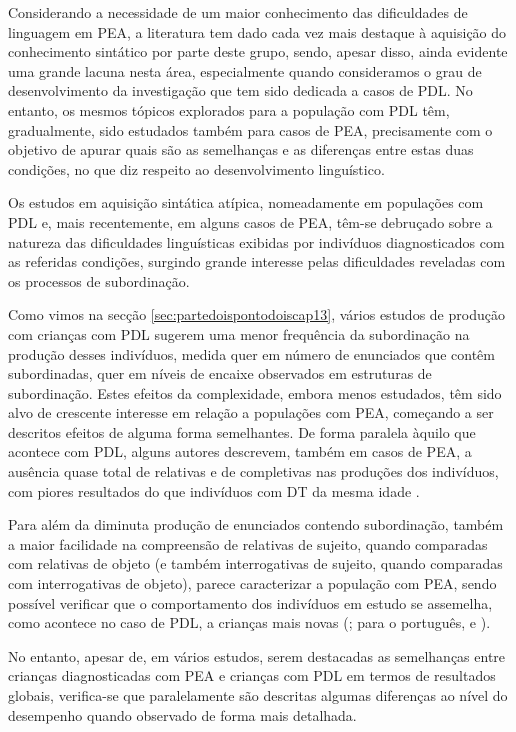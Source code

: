 \documentclass[output=paper,colorlinks,citecolor=brown,booklanguage=portuguese]{langscibook}
\begin{document}
Considerando a necessidade de um maior conhecimento das dificuldades de linguagem em PEA, a literatura tem dado cada vez mais destaque à aquisição do conhecimento sintático por parte deste grupo, sendo, apesar disso, ainda evidente uma grande lacuna nesta área, especialmente quando consideramos o grau de desenvolvimento da investigação que tem sido dedicada a casos de PDL. No entanto, os mesmos tópicos explorados para a população com PDL têm, gradualmente, sido estudados também para casos de PEA, precisamente com o objetivo de apurar quais são as semelhanças e as diferenças entre estas duas condições, no que diz respeito ao desenvolvimento linguístico. 

Os estudos em aquisição sintática atípica, nomeadamente em populações com PDL e, mais recentemente, em alguns casos de PEA, têm-se debruçado sobre a natureza das dificuldades linguísticas exibidas por indivíduos diagnosticados com as referidas condições, surgindo grande interesse pelas dificuldades reveladas com os processos de subordinação. 

Como vimos na secção \ref{sec:partedoispontodoiscap13}, vários estudos de produção com crianças com PDL sugerem uma menor frequência da subordinação na produção desses indivíduos, medida quer em número de enunciados que contêm subordinadas, quer em níveis de encaixe observados em estruturas de subordinação. Estes efeitos da complexidade, embora menos estudados, têm sido alvo de crescente interesse em relação a populações com PEA, começando a ser descritos efeitos de alguma forma semelhantes. De forma paralela àquilo que acontece com PDL, alguns autores descrevem, também em casos de PEA, a ausência quase total de relativas e de completivas nas produções dos indivíduos, com piores resultados do que indivíduos com DT da mesma idade \citep{Durrleman2009}. 

Para além da diminuta produção de enunciados contendo subordinação, também a maior facilidade na compreensão de relativas de sujeito, quando comparadas com relativas de objeto (e também interrogativas de sujeito, quando comparadas com interrogativas de objeto), parece caracterizar a população com PEA, sendo possível verificar que o comportamento dos indivíduos em estudo se assemelha, como acontece no caso de PDL, a crianças mais novas (\citealp{Riches2010}; para o português, \citealp{Martins2018} e \citealp{Martinsempreparacao}).

No entanto, apesar de, em vários estudos, serem destacadas as semelhanças entre crianças diagnosticadas com PEA e crianças com PDL em termos de resultados globais, verifica-se que paralelamente são descritas algumas diferenças ao nível do desempenho quando observado de forma mais detalhada. 
\end{document}
